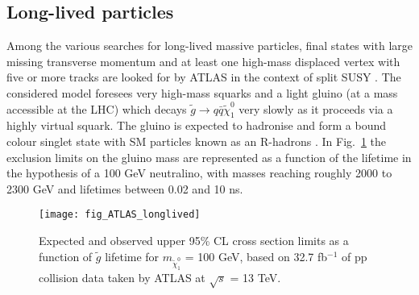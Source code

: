 \documentclass{ws-ijmpcs}
\begin{document}
\subsection{Long-lived particles}
Among the various searches for long-lived massive particles, final states with large missing transverse momentum and at least one high-mass displaced vertex with five or more tracks are looked for by ATLAS in the context of split SUSY \cite{ATLAS_longlived}. The considered model foresees very high-mass squarks and a light gluino (at a mass accessible at the LHC) which decays $\tilde{g} \rightarrow q \bar{q} \tilde{\chi}^0_1$ very slowly as it proceeds via a highly virtual squark. The gluino is expected to hadronise and form a bound colour singlet state with SM particles known as an
R-hadrons \cite{Rhadrons}.
In Fig.~\ref{ATLASlonglived} the exclusion limits on the gluino mass are represented as a function of the lifetime in the hypothesis of a 100 GeV neutralino, with masses reaching roughly 2000 to 2300 GeV and lifetimes between 0.02 and 10 ns.

\begin{figure}[pb]
\centerline{\texttt{[image: fig\_ATLAS\_longlived]}}
\vspace*{8pt}
\caption{Expected and observed upper 95\% CL cross section limits as a function of $\tilde{g}$ lifetime for $m_{\tilde{\chi}^0_1}$ = 100 GeV, based on 32.7 fb$^{-1}$ of pp collision data taken by ATLAS at $\sqrt{s}$ = 13 TeV. \label{ATLASlonglived}}
\end{figure}



\end{document}
